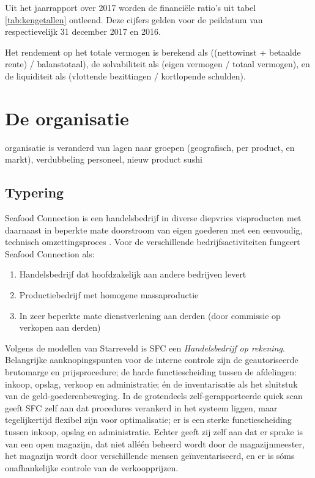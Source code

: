 \documentclass[10pt,a4paper,twoside]{report}
\begin{document}
Uit het jaarrapport over 2017 worden de financiële ratio’s uit tabel \ref{tab:kengetallen} ontleend. Deze cijfers gelden voor de peildatum van respectievelijk 31 december 2017 en 2016.

Het rendement op het totale vermogen is berekend als ((nettowinst + betaalde rente) / balanstotaal), de solvabiliteit als (eigen vermogen / totaal vermogen), en de liquiditeit als (vlottende bezittingen / kortlopende schulden). \citep{jaarrapport2017}

\newpage
\section{De organisatie}
organisatie is veranderd van lagen naar groepen (geografisch, per product, en markt), verdubbeling personeel, nieuw product sushi

\subsection{Typering}
Seafood Connection is een handelsbedrijf in diverse diepvries visproducten met daarnaast in beperkte mate doorstroom van eigen goederen met een eenvoudig, technisch omzettingsproces \citep{aoibsfc}. Voor de verschillende bedrijfsactiviteiten fungeert Seafood Connection als:

\begin{enumerate}
    \item Handelsbedrijf dat hoofdzakelijk aan andere bedrijven levert
    \item Productiebedrijf met homogene massaproductie
    \item In zeer beperkte mate dienstverlening aan derden (door commissie op verkopen aan derden)
\end{enumerate}

Volgens de modellen van Starreveld is SFC een \textit{Handelsbedrijf op rekening}. Belangrijke aanknopingspunten voor de interne controle zijn de geautoriseerde brutomarge en prijsprocedure; de harde functiescheiding tussen de afdelingen: inkoop, opslag, verkoop en administratie; én de inventarisatie als het sluitstuk van de geld-goederenbeweging. In de grotendeels zelf-gerapporteerde quick scan geeft SFC zelf aan dat procedures verankerd in het systeem liggen, maar tegelijkertijd flexibel zijn voor optimalisatie; er is een sterke functiescheiding tussen inkoop, opslag en administratie. Echter geeft zij zelf aan dat er sprake is van een open magazijn, dat niet alléén beheerd wordt door de magazijnmeester, het magazijn wordt door verschillende mensen geïnventariseerd, en er is sóms onafhankelijke controle van de verkoopprijzen. \citep{bivperspectief,quickscan}
\end{document}
